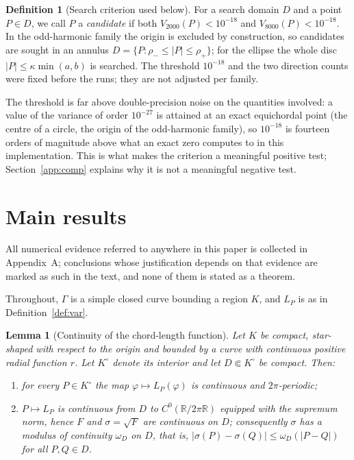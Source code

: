 \documentclass[11pt]{article}
\newcommand{\R}{\mathbb{R}}
\newtheorem{lemma}[theorem]{Lemma}
\theoremstyle{definition}
\newtheorem{definition}[theorem]{Definition}
\theoremstyle{remark}
\begin{document}
\begin{definition}[Search criterion used below]\label{def:criterion}
For a search domain $D$ and a point $P\in D$, we call $P$ a \emph{candidate} if both $V_{2000}(P)<10^{-18}$ and
$V_{8000}(P)<10^{-18}$. In the odd-harmonic family the origin is excluded by construction, so candidates are
sought in an annulus $D=\{P: \rho_-\le|P|\le\rho_+\}$; for the ellipse the whole disc $|P|\le\kappa\min(a,b)$ is
searched. The threshold $10^{-18}$ and the two direction counts were fixed before the runs; they are not adjusted
per family.
\end{definition}

The threshold is far above double-precision noise on the quantities involved: a value of the variance of order
$10^{-27}$ is attained at an exact equichordal point (the centre of a circle, the origin of the odd-harmonic
family), so $10^{-18}$ is fourteen orders of magnitude above what an exact zero computes to in this
implementation. This is what makes the criterion a meaningful positive test; Section~\ref{app:comp} explains why
it is not a meaningful negative test.

\section{Main results}\label{sec:main}

All numerical evidence referred to anywhere in this paper is collected in Appendix~A; conclusions whose justification depends on that evidence are marked as such in the text, and none of them is stated as a theorem.

Throughout, $\Gamma$ is a simple closed curve bounding a region $K$, and $L_P$ is as in Definition~\ref{def:var}.

\begin{lemma}[Continuity of the chord-length function]\label{lem:continuity}
Let $K$ be compact, star-shaped with respect to the origin and bounded by a curve with continuous positive radial
function $r$. Let $K^\circ$ denote its interior and let $D\Subset K^\circ$ be compact. Then:
\begin{enumerate}
\item[(i)] for every $P\in K^\circ$ the map $\varphi\mapsto L_P(\varphi)$ is continuous and $2\pi$-periodic;
\item[(ii)] $P\mapsto L_P$ is continuous from $D$ to $C^0(\R/2\pi\R)$ equipped with the supremum norm, hence
$F$ and $\sigma=\sqrt{F}$ are continuous on $D$; consequently $\sigma$ has a modulus of continuity $\omega_D$ on
$D$, that is, $|\sigma(P)-\sigma(Q)|\le\omega_D(|P-Q|)$ for all $P,Q\in D$.
\end{enumerate}
\end{lemma}
\end{document}

